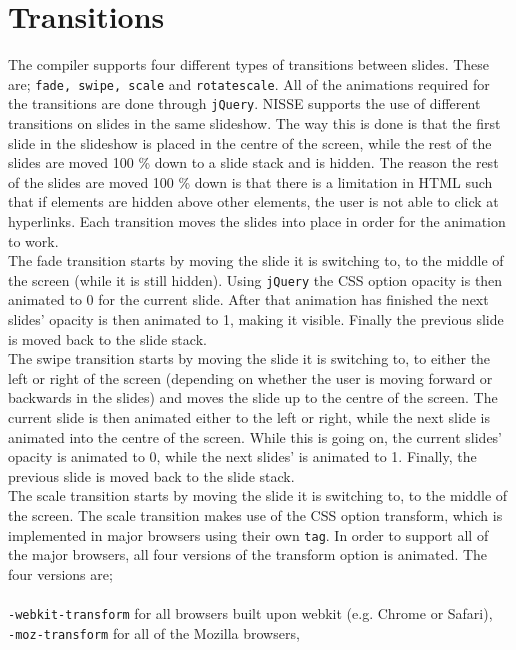 \section{Transitions}
The compiler supports four different types of transitions between slides. These are; \lstinline!fade, swipe, scale! and \lstinline!rotatescale!. All of the animations required for the transitions are done through \texttt{jQuery}. NISSE supports the use of different transitions on slides in the same slideshow. The way this is done is that the first slide in the slideshow is placed in the centre of the screen, while the rest of the slides are moved 100 \% down to a slide stack and is hidden. The reason the rest of the slides are moved 100 \% down is that there is a limitation in HTML such that if elements are hidden above other elements, the user is not able to click at hyperlinks. Each transition moves the slides into place in order for the animation to work.\\
The fade transition starts by moving the slide it is switching to, to the middle of the screen (while it is still hidden). Using \texttt{jQuery} the CSS option opacity is then animated to 0 for the current slide. After that animation has finished the next slides' opacity is then animated to 1, making it visible. Finally the previous slide is moved back to the slide stack. \\
The swipe transition starts by moving the slide it is switching to, to either the left or right of the screen (depending on whether the user is moving forward or backwards in the slides) and moves the slide up to the centre of the screen. The current slide is then animated either to the left or right, while the next slide is animated into the centre of the screen. While this is going on, the current slides' opacity is animated to 0, while the next slides' is animated to 1. Finally, the previous slide is moved back to the slide stack. \\
The scale transition starts by moving the slide it is switching to, to the middle of the screen. The scale transition makes use of the CSS option transform, which is implemented in major browsers using their own \texttt{tag}. In order to support all of the major browsers, all four versions of the transform option is animated. The four versions are;
\\ \\
\texttt{-webkit-transform} for all browsers built upon webkit (e.g. Chrome or Safari), \\
\texttt{-moz-transform} for all of the Mozilla browsers, \\

